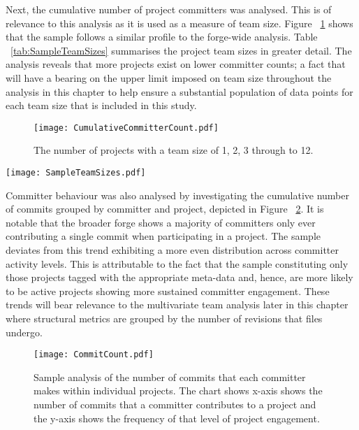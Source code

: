 Next, the cumulative number of project committers was analysed. This is of relevance to this analysis as it is used as a measure of team size. Figure ~\ref{fig:CumulativeCommitterCount} shows that the sample follows a similar profile to the forge-wide analysis. Table ~\ref{tab:SampleTeamSizes} summarises the project team sizes in greater detail. The analysis reveals that more projects exist on lower committer counts; a fact that will have a bearing on the upper limit imposed on team size throughout the analysis in this chapter to help ensure a substantial population of data points for each team size that is included in this study.

\begin{figure}[htbp!] 
\centering    
\texttt{[image: CumulativeCommitterCount.pdf]}
\caption{The number of projects with a team size of 1, 2, 3 through to 12.}
\label{fig:CumulativeCommitterCount}
\end{figure}

\begin{table}
\centering 
{}
\begin{tabular}
 \centering 
 \texttt{[image: SampleTeamSizes.pdf]}
 \label{tab:SampleTeamSizes}
\end{tabular}
\end{table}

Committer behaviour was also analysed by investigating the cumulative number of commits grouped by committer and project, depicted in Figure ~\ref{fig:CommitCountBarChart}. It is notable that the broader forge shows a majority of committers only ever contributing a single commit when participating in a project. The sample deviates from this trend exhibiting a more even distribution across committer activity levels. This is attributable to the fact that the sample constituting only those projects tagged with the appropriate meta-data and, hence, are more likely to be active projects showing more sustained committer engagement. These trends will bear relevance to the multivariate team analysis later in this chapter where structural metrics are grouped by the number of revisions that files undergo.

\begin{figure}[htbp!] 
\centering    
\texttt{[image: CommitCount.pdf]}
\caption[The number of commits that each committer makes within individual projects]{Sample analysis of the number of commits that each committer makes within individual projects. The chart shows  x-axis shows the number of commits that a committer contributes to a project and the y-axis shows the frequency of that level of project engagement.}
\label{fig:CommitCountBarChart}
\end{figure}

